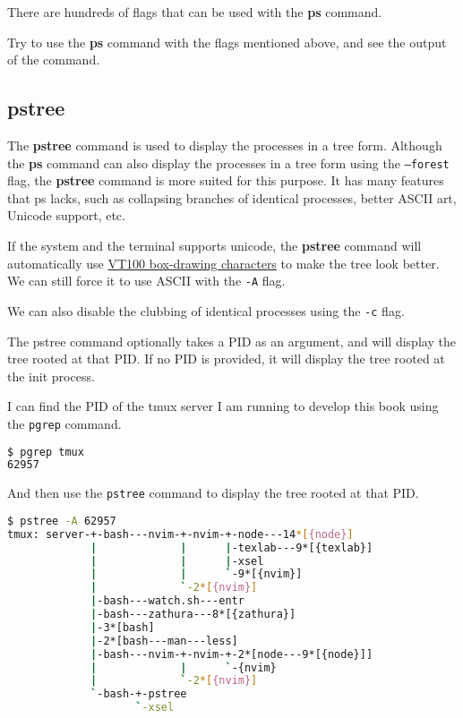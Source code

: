 There are hundreds of flags that can be used with the \textbf{ps} command.

\begin{exercise}
  Try to use the \textbf{ps} command with the flags mentioned above, and see
  the output of the command.
\end{exercise}

\subsection{pstree}

The \textbf{pstree} command is used to display the processes in a tree form.
Although the \textbf{ps} command can also display the processes in a tree form
using the \texttt{--forest} flag, the \textbf{pstree} command is more suited
for this purpose. It has many features that ps lacks, such as collapsing
branches of identical processes, better ASCII art, Unicode support, etc.

If the system and the terminal supports unicode, the \textbf{pstree} command
will automatically use
\href{https://en.wikipedia.org/wiki/Box-drawing\_character}{VT100 box-drawing characters}
to make the tree look better. We can still force it to use ASCII with the
\texttt{-A} flag.

We can also disable the clubbing of identical processes using the \texttt{-c} flag.

The pstree command optionally takes a PID as an argument, and will display
the tree rooted at that PID. If no PID is provided, it will display the
tree rooted at the init process.

I can find the PID of the tmux server I am running to develop this book
using the \texttt{pgrep} command.
\begin{lstlisting}[language=bash]
$ pgrep tmux
62957
\end{lstlisting}

And then use the \texttt{pstree} command
to display the tree rooted at that PID.

\begin{lstlisting}[language=bash]
$ pstree -A 62957
tmux: server-+-bash---nvim-+-nvim-+-node---14*[{node}]
             |             |      |-texlab---9*[{texlab}]
             |             |      |-xsel
             |             |      `-9*[{nvim}]
             |             `-2*[{nvim}]
             |-bash---watch.sh---entr
             |-bash---zathura---8*[{zathura}]
             |-3*[bash]
             |-2*[bash---man---less]
             |-bash---nvim-+-nvim-+-2*[node---9*[{node}]]
             |             |      `-{nvim}
             |             `-2*[{nvim}]
             `-bash-+-pstree
                    `-xsel
\end{lstlisting}

